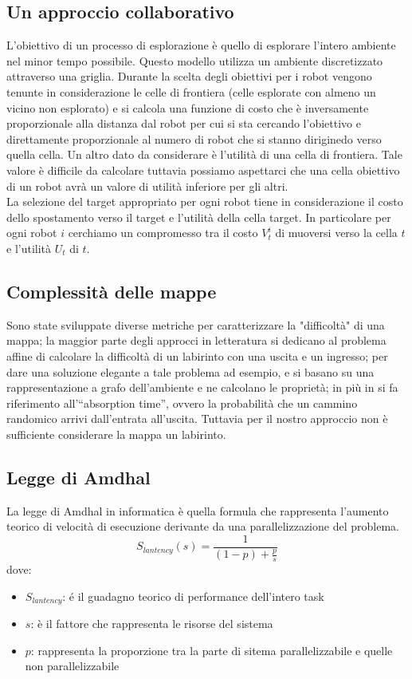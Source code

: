 \subsection{Un approccio collaborativo}
  \cite{burgard2002collaborative} L'obiettivo di un processo di esplorazione è quello di esplorare l'intero ambiente 
  nel minor tempo possibile. Questo modello utilizza un ambiente discretizzato attraverso una griglia. Durante la 
  scelta degli obiettivi per i robot vengono tenunte in considerazione le celle di frontiera (celle esplorate con
  almeno un vicino non esplorato) e si calcola una funzione di costo che è inversamente proporzionale alla distanza
  dal robot per cui si sta cercando l'obiettivo e direttamente proporzionale al numero di robot che si stanno diriginedo
  verso quella cella. Un altro dato da considerare è l'utilità di una cella di frontiera. Tale valore è
  difficile da calcolare tuttavia possiamo aspettarci che una cella obiettivo di un robot avrà un valore di utilità
  inferiore per gli altri. \\
  La selezione del target appropriato per ogni robot tiene in considerazione il costo dello spostamento verso il target
  e l'utilità della cella target. In particolare per ogni robot $i$ cerchiamo un compromesso tra il costo $V^i_t$ di
  muoversi verso la cella $t$ e l'utilità $U_t$ di $t$.
\subsection{Complessità delle mappe}
  Sono state sviluppate diverse metriche per caratterizzare la "difficoltà" di
  una mappa; la maggior parte degli approcci in letteratura si dedicano al
  problema affine di calcolare la difficoltà di un labirinto con una uscita e un
  ingresso; per dare una soluzione elegante a tale problema ad esempio,
  \cite{amancio2011concepts} e \cite{mcclendon2001complexity} si basano su una
  rappresentazione a grafo dell'ambiente e ne calcolano le proprietà; in più
  in \cite{amancio2011concepts} si fa riferimento all'``absorption time'', ovvero
  la probabilità che un cammino randomico arrivi dall'entrata all'uscita.
  Tuttavia per il nostro approccio non è sufficiente considerare la mappa un
  labirinto.
\subsection{Legge di Amdhal}
  La legge di Amdhal\cite{amdhal} in informatica è quella formula che rappresenta 
  l'aumento teorico di velocità di esecuzione derivante da una 
  parallelizzazione del problema. 
  $$S_{lantency}(s) = \frac{1}{(1-p) + \frac{p}{s}}$$
  dove:
  \begin{itemize}
    \item $S_{lantency}$: é il guadagno teorico di performance dell'intero task
    \item $s$: è il fattore che rappresenta le risorse del sistema
    \item $p$: rappresenta la proporzione tra la parte di sitema parallelizzabile e quelle non parallelizzabile
  \end{itemize}
  
